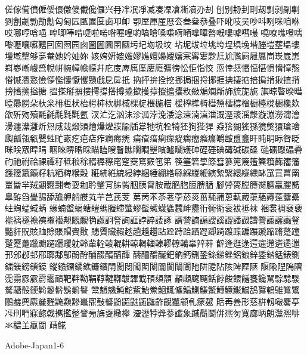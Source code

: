 傞傢僃僨僱僾儇儌儍儎儳儸兴冄冸冺凈减凑凓凔凘凟刅刦
刨别刱刲刵刼剚剠剮剸剹劊劌勡勩勱匃匑匟匭匲匽卥卭卹
卾厔厙厪厯厺叁叄叅叠吓吪吱吴吵呌咧咪咱咻哎哪哼唅唈
唕唧唪唶啑啦喏喒喔喤喲嗃嗆嗓嗛嗬嗮嗱嗶嗸嘅嘍嘑嘒嘬
嘵嘹噍噔嚅嚟嚦嚷囌囏囙囡囫园囱圇圌圚圛圝圬圮圽圾坟
坫坭坺垃垗垮埕埧堍堦塍塏塟塭塿墁墘墼够夣奙她妗妯妳
姟姱姸媲媸嫪嫶嬛嬝嬡嬸宷寗寠尟尪尬尶屙屜屭峝崁崴崽
嵙嵾嶃巇巹帨帲帵幛幨幪幷庀庋庳庽廑廔廕彍徬忪怇恉恔
恧悻惄惽愊愖愪愶慞慤慻慽慿憝憸懜懢懥懨戄戇戱戹戽扺
抐抨拚拴挖挪挶捆捋捓捱捵捿掂掊掮掯揪揸揹搒搘搠搤搪
搵搽搿摒摟摴撐撘撙撬撳擭擰攛攟攮敉敠斒斕斴斾旈旎旐
旟晾暋暌暳曀曏朥朵杕枀枏枑枤枱枵枾栨梆棫棵椗椳椸楛
楥榨榫榯槥槱橊橕橧橱檯櫈櫉欃欻欿歽歾殰毷毹氄氉氍氬
汊汒汔汹沬沴泒浡浼涹淰湅湳湻湽溉溼滚滛漦漩漰澇澝澮
澷瀍瀠灉炘炰烕烖煅熲燴爗爟牃牏牐牚牠牨牷犄狉狥狴猂
猋猞猢猺猻獍獘獧瑲璯瓟瓤瓴瓻甖甡甿畞疙疤痁痄痌痗痜
痡痯瘄瘌瘝瘲瘸癅癊癟皭皽盙盫盰盹眀眎眢眨眯眹眾睅睊
睏睞睤睧睬瞄瞌瞍瞖瞧瞯瞷瞾矉矑矙矱砷硜硾碘碡碱碳磉
磓礌礟礧礨礿祂祔祫祼禫秄秪稂稌稰稺穄窀窆窔窵窽竾笫
筷箠箬箰篨篲篸篼篾簉簨簯籂籒籓籛籜籝籲籽粇粞粺糇糓
糚紼絍綂綅綍綑綞綳綹緐緥緵緶縯縶繄繯繸纁缽罛罝罥罱
罿羀羋羢翽翾翿耇耍耞耹肈肎胏胔胭胰胷胺胾脃脗脰腗腯
腳膋膐膛膞臋臕臝臞臡臯臶舀舋舓舔舚舺艄艭芄芉芑芪芰
苐苪苯苶荖荸菸菼葘蒓蒱蒽蓻蕆蕖蕝薅薘虂虆蛀蜔蜢蜮蜹
蝝蝻螌螎螗螘螞螣螮螿蟉蟚蠘蠛蠭蠺衅衋衎衕衚衮袚袛袜
裍裠裯褎褏褦褵襚襜襫襰襼覥覵覼觕詉詗詧詾誆誖誶諉諑
諝諬諵謆謏謑譅譒譭譸譼譾讅讟豋豓豻貺賅賉賒賬賵賷贁
贃贗贜赮趑趟趫趲跕跧跱跲跴踁踋踦踱蹀蹁蹍蹏蹜蹡蹩蹱
蹵蹷躉躐躕躚躧躩躭軨軰輇輘輥輧輬輵輺轃轇轑轕辠辡辢
辥逄逛逯遌遛遰遴遹邋邘邠邲邽郉郰鄅鄥酚酧酺醊醑醕醰
醻醽釂釅鈀鈉鈣鉶銎銯銻銼鋁鋃鋅鋈錔錳錶鍘鍿鎂鎊鎻鏌
鏦鏹鐂鐍鐎鐮鑌閈閡閿闆闉闑闒闠闤闦阤阱阸阽陔陴陻陿
隁隃隉隖隮霃霛霡霢霨霱靧靶靽靿鞙鞟鞬鞹韍韠韯頇頦頮
顢顣颴飅餂餑餕餵饈饔饞駡騌騐騣驁驑骽骾鬁鬉鬋鬍鬎鬙
鬵魈魕魨鮀鮆鮐鮝鮰鮿鯈鯿鰂鰜鰵鱄鱖鱡鱨鴰鴽鵪鵻鷥鷩
鷳鹺麂麃麄麰黤黰黲鼉鼏鼔鼛鼢鼦鼪鼫鼴齚齯龞龥𠃵𤸄𤿲
𧵳再善形慈栟軔㗞𪊲𠅘𠖱𠛬𠵘𥧌㦤㦸𢹂㩜𢿫𧦴㫄㫋㪅㯳櫸
㴱𤁋㹀㢡𦲞䜟𧰼䠞鬝鬬倂凞匇寬廊昞朗灊凞啡氺穠𦍌蠃閫
靕𩸽

Adobe-Japan1-6


